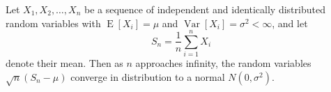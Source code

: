 \documentclass{article}
\begin{document}
Let $X_1, X_2, \ldots, X_n$ be a sequence of independent and
identically distributed random variables with
$\operatorname{E}[X_i] = \mu$ and
$\operatorname{Var}[X_i] = \sigma^2 < \infty$, and let
\begin{equation*}
S_n = \frac{1}{n}\sum_{i=1}^{n} X_i
\end{equation*}
denote their mean. Then as $n$ approaches infinity, the
random variables $\sqrt{n}(S_n - \mu)$ converge in
distribution to a normal $N(0, \sigma^2)$.

\end{document}
